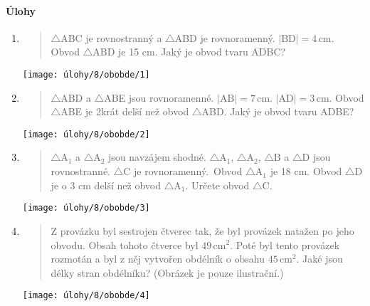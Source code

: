 \paragraph{Úlohy}
\begin{enumerate}
    \item
    \begin{minipage}[t]{\linewidth}
        \begin{quote}
            $\triangle$ABC je rovnostranný a $\triangle$ABD je rovnoramenný. $\lvert \text{BD} \rvert = 4\,\text{cm}$.
            Obvod $\triangle$ABD je 15 cm.
            Jaký je obvod tvaru ADBC?
        \end{quote}
        \centering
        \texttt{[image: úlohy/8/obobde/1]}

    \end{minipage}

    \item
    \begin{minipage}[t]{\linewidth}
        \begin{quote}
            $\triangle$ABD a $\triangle$ABE jsou rovnoramenné. $\lvert \text{AB} \rvert = 7\,\text{cm}$. $\lvert \text{AD} \rvert = 3\,\text{cm}$.
            Obvod $\triangle$ABE je 2krát delší než obvod $\triangle$ABD. Jaký je obvod tvaru ADBE?
        \end{quote}
        \centering
        \texttt{[image: úlohy/8/obobde/2]}

    \end{minipage}

    \item
    \begin{minipage}[t]{\linewidth}
        \begin{quote}
            $\triangle{\text{A}}_{1}$ a $\triangle{\text{A}}_{2}$ jsou navzájem shodné. $\triangle{\text{A}}_{1}$, $\triangle{\text{A}}_{2}$, $\triangle{\text{B}}$ a $\triangle{\text{D}}$ jsou rovnostranné. $\triangle{\text{C}}$ je rovnoramenný.\             Obvod $\triangle{\text{A}}_{1}$ je 18 cm.
            Obvod $\triangle$D je o 3 cm delší než obvod $\triangle{\text{A}}_{1}$.
            Určete obvod $\triangle$C.
        \end{quote}
        \centering
        \texttt{[image: úlohy/8/obobde/3]}

    \end{minipage}

    \item
    \begin{minipage}[t]{\linewidth}
        \begin{quote}
            Z provázku byl sestrojen čtverec tak, že byl provázek natažen po jeho obvodu.
            Obsah tohoto čtverce byl $49\,\text{cm}^{2}$.
            Poté byl tento provázek rozmotán a byl z něj vytvořen obdélník o obsahu $45\,\text{cm}^{2}$.
            Jaké jsou délky stran obdélníku?
            (Obrázek je pouze ilustrační.)
        \end{quote}
        \centering
        \texttt{[image: úlohy/8/obobde/4]}


\end{minipage}
\end{enumerate}
